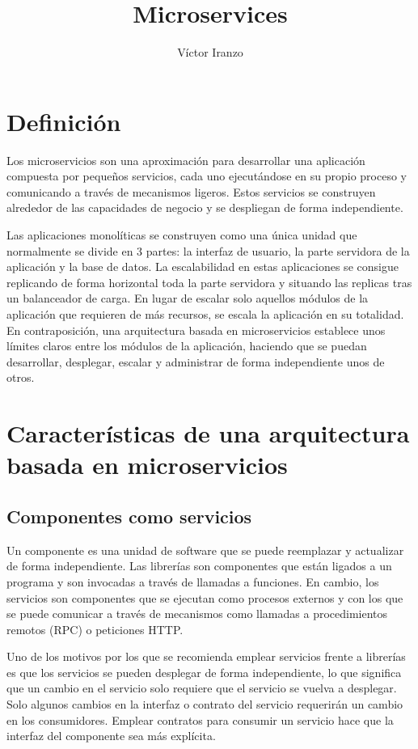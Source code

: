 \documentclass[11pt,a4paper]{article}
\author{Víctor Iranzo}
\title{Microservices}
\begin{document}
\maketitle

\section{Definición}

Los microservicios son una aproximación para desarrollar una aplicación compuesta por pequeños servicios, cada uno ejecutándose en su propio proceso y comunicando a través de mecanismos ligeros. Estos servicios se construyen alrededor de las capacidades de negocio y se despliegan de forma independiente.

Las aplicaciones monolíticas se construyen como una única unidad que normalmente se divide en 3 partes: la interfaz de usuario, la parte servidora de la aplicación y la base de datos. La escalabilidad en estas aplicaciones se consigue replicando de forma horizontal toda la parte servidora y situando las replicas tras un balanceador de carga. En lugar de escalar solo aquellos módulos de la aplicación que requieren de más recursos, se escala la aplicación en su totalidad. En contraposición, una arquitectura basada en microservicios establece unos límites claros entre los módulos de la aplicación, haciendo que se puedan desarrollar, desplegar, escalar y administrar de forma independiente unos de otros.


\section{Características de una arquitectura basada en microservicios}

\subsection{Componentes como servicios}

Un componente es una unidad de software que se puede reemplazar y actualizar de forma independiente. Las librerías son componentes que están ligados a un programa y son invocadas a través de llamadas a funciones. En cambio, los servicios son componentes que se ejecutan como procesos externos y con los que se puede comunicar a través de mecanismos como llamadas a procedimientos remotos (RPC) o peticiones HTTP.

Uno de los motivos por los que se recomienda emplear servicios frente a librerías es que los servicios se pueden desplegar de forma independiente, lo que significa que un cambio en el servicio solo requiere que el servicio se vuelva a desplegar. Solo algunos cambios en la interfaz o contrato del servicio requerirán un cambio en los consumidores. Emplear contratos para consumir un servicio hace que la interfaz del componente sea más explícita.
\end{document}
